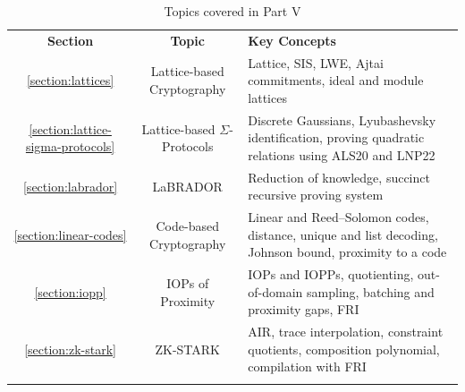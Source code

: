 \documentclass[../../../book]{subfiles}
\begin{document}
\begin{table}[H]
    \centering
    \begin{tabularx}{\textwidth}{ccX}
        \Xhline{3\arrayrulewidth}
        \rowcolor{oc-cyan-3}\textbf{Section} & \textbf{Topic} & \textbf{Key Concepts} \\
        \Xhline{3\arrayrulewidth}
        \rowcolor{oc-cyan-1}\ref{section:lattices} & Lattice-based Cryptography & Lattice, SIS, LWE, Ajtai commitments, ideal and module lattices \\
        \hline
        \rowcolor{oc-cyan-2}\ref{section:lattice-sigma-protocols} & Lattice-based $\Sigma$-Protocols &
        Discrete Gaussians, Lyubashevsky identification, proving quadratic relations using ALS20 and LNP22 \\
        \hline
        \rowcolor{oc-cyan-1}\ref{section:labrador} & LaBRADOR &
        Reduction of knowledge, succinct recursive proving system \\
        \hline
        \rowcolor{oc-cyan-2}\ref{section:linear-codes} & Code-based Cryptography &
        Linear and Reed--Solomon codes, distance, unique and list decoding, Johnson bound, proximity to a code \\
        \hline
        \rowcolor{oc-cyan-1}\ref{section:iopp} & IOPs of Proximity &
        IOPs and IOPPs, quotienting, out-of-domain sampling, batching and proximity gaps, FRI \\
        \hline
        \rowcolor{oc-cyan-2}\ref{section:zk-stark} & ZK-STARK &
        AIR, trace interpolation, constraint quotients, composition polynomial, compilation with FRI \\
        \Xhline{3\arrayrulewidth}
    \end{tabularx}
    \caption{Topics covered in Part V}
    \label{tab:essentialls-5}
\end{table}
\end{document}
